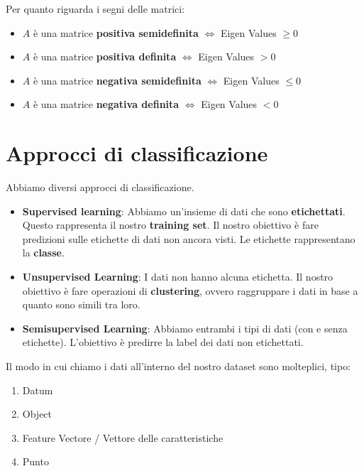 Per quanto riguarda i segni delle matrici:

\begin{itemize}
    \item $A$ è una matrice \textbf{positiva semidefinita} $\iff$ Eigen Values $\geq 0$
    \item $A$ è una matrice \textbf{positiva definita} $\iff$ Eigen Values $> 0$
    \item  $A$ è una matrice \textbf{negativa semidefinita} $\iff$ Eigen Values $\leq 0$    
    \item $A$ è una matrice \textbf{negativa definita} $\iff$ Eigen Values $< 0$
\end{itemize}




\section{Approcci di classificazione}
\label{sec:approcci-di-classificazione}

Abbiamo diversi approcci di classificazione.

\begin{itemize}
    \item \textbf{Supervised learning}: Abbiamo un'insieme di dati che sono \textbf{etichettati}.
          Questo rappresenta il nostro \textbf{training set}. Il nostro obiettivo è fare
          predizioni sulle etichette di dati non ancora visti. Le etichette rappresentano
          la \textbf{classe}.
    \item \textbf{Unsupervised Learning}: I dati non hanno alcuna etichetta. Il nostro
          obiettivo è fare operazioni di \textbf{clustering}, ovvero raggruppare i dati in base a quanto sono simili tra loro.
    \item \textbf{Semisupervised Learning}: Abbiamo entrambi i tipi di dati (con e senza etichette). L'obiettivo è predirre la label
          dei dati non etichettati.
\end{itemize}

Il modo in cui chiamo i dati all'interno del nostro dataset sono molteplici,
tipo:
\begin{enumerate}
    \item Datum
    \item Object
    \item Feature Vectore / Vettore delle caratteristiche
    \item Punto
\end{enumerate}

